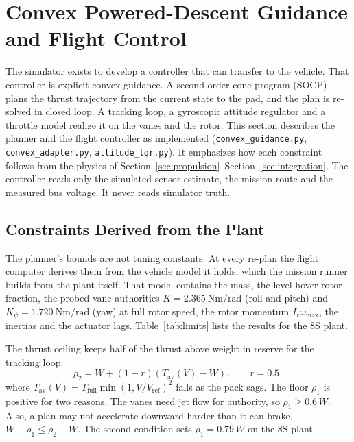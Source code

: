 \documentclass[journal]{IEEEtran}
\newcommand{\refsec}[1]{Section~\ref{#1}}
\newcommand{\reftab}[1]{Table~\ref{#1}}
\newcommand{\Ir}{I_r}
\newcommand{\wmax}{\omega_{\max}}
\begin{document}
\section{Convex Powered-Descent Guidance and Flight Control}
\label{sec:guidance}

The simulator exists to develop a controller that can transfer to the vehicle.
That controller is explicit convex guidance.
A second-order cone program (SOCP) plans the thrust trajectory from the current state to the pad, and the plan is re-solved in closed loop.
A tracking loop, a gyroscopic attitude regulator and a throttle model realize it on the vanes and the rotor.
This section describes the planner and the flight controller as implemented (\texttt{convex\_guidance.py}, \texttt{convex\_adapter.py}, \texttt{attitude\_lqr.py}).
It emphasizes how each constraint follows from the physics of \refsec{sec:propulsion}--\refsec{sec:integration}.
The controller reads only the simulated sensor estimate, the mission route and the measured bus voltage.
It never reads simulator truth.

\subsection{Constraints Derived from the Plant}
\label{sec:limits}

The planner's bounds are not tuning constants.
At every re-plan the flight computer derives them from the vehicle model it holds, which the mission runner builds from the plant itself.
That model contains the mass, the level-hover rotor fraction, the probed vane authorities $K = \SI{2.365}{\newton\metre\per\radian}$ (roll and pitch) and $K_{\psi} = \SI{1.720}{\newton\metre\per\radian}$ (yaw) at full rotor speed, the rotor momentum $\Ir\wmax$, the inertias and the actuator lags.
\reftab{tab:limits} lists the results for the 8S plant.

The thrust ceiling keeps half of the thrust above weight in reserve for the tracking loop:
\begin{equation}
\rho_2 = W + (1 - r)\left(T_{\text{av}}(V) - W\right), \qquad r = 0.5,
\label{eq:rho2}
\end{equation}
where $T_{\text{av}}(V) = T_{\text{full}}\min(1, V/V_{\text{ref}})^2$ falls as the pack sags.
The floor $\rho_1$ is positive for two reasons.
The vanes need jet flow for authority, so $\rho_1 \ge 0.6\,W$.
Also, a plan may not accelerate downward harder than it can brake, $W - \rho_1 \le \rho_2 - W$.
The second condition sets $\rho_1 = 0.79\,W$ on the 8S plant.
\end{document}
